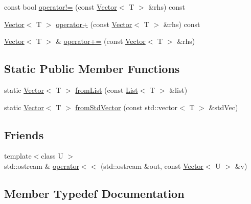 \begin{DoxyCompactItemize}
\item 
const bool \hyperlink{classprism_1_1_vector_a7f3b55afc7268eba0f06a16f54b66b0c}{operator!=} (const \hyperlink{classprism_1_1_vector}{Vector}$<$ T $>$ \&rhs) const 
\item 
\hyperlink{classprism_1_1_vector}{Vector}$<$ T $>$ \hyperlink{classprism_1_1_vector_a4105543bf953174bbb80712f60ec1f59}{operator+} (const \hyperlink{classprism_1_1_vector}{Vector}$<$ T $>$ \&rhs) const 
\item 
\hyperlink{classprism_1_1_vector}{Vector}$<$ T $>$ \& \hyperlink{classprism_1_1_vector_af617e820d712cdfa9c5e6c34948512a7}{operator+=} (const \hyperlink{classprism_1_1_vector}{Vector}$<$ T $>$ \&rhs)
\end{DoxyCompactItemize}
\subsection*{Static Public Member Functions}
\begin{DoxyCompactItemize}
\item 
static \hyperlink{classprism_1_1_vector}{Vector}$<$ T $>$ \hyperlink{classprism_1_1_vector_a8bf046e27eeb6c73e372dc4994d76423}{from\+List} (const \hyperlink{classprism_1_1_list}{List}$<$ T $>$ \&list)
\item 
static \hyperlink{classprism_1_1_vector}{Vector}$<$ T $>$ \hyperlink{classprism_1_1_vector_a81bc5717530cbf13ad87627b2d05d26e}{from\+Std\+Vector} (const std\+::vector$<$ T $>$ \&std\+Vec)
\end{DoxyCompactItemize}
\subsection*{Friends}
\begin{DoxyCompactItemize}
\item 
{\footnotesize template$<$class U $>$ }\\std\+::ostream \& \hyperlink{classprism_1_1_vector_a95dc7e5dc3256b79bdc98875215ec4aa}{operator$<$$<$} (std\+::ostream \&out, const \hyperlink{classprism_1_1_vector}{Vector}$<$ U $>$ \&v)
\end{DoxyCompactItemize}


\subsection{Member Typedef Documentation}
